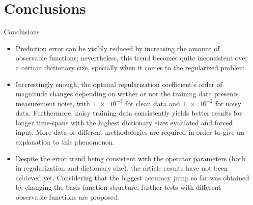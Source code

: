 \documentclass{beamer}
\begin{document}
\section{Conclusions}

\begin{frame}[allowframebreaks]{Conclusions}
    \begin{itemize}
        \item Prediction error can be visibly reduced by increasing the amount of observable functions; nevertheless, this trend becomes quite inconsistent over a certain dictionary size, specially when it comes to the regularized problem.
        \item Interestingly enough, the optimal regularization coefficient's order of magnitude changes depending on wether or not the training data presents measurement noise, with $\num{1e-3}$ for clean data and $\num{1e-2}$ for noisy data. Furthermore, noisy training data consistently yields better results for longer time-spans with the highest dictionary sizes evaluated and forced input. More data or different methodologies are required in order to give an explanation to this phenomenon.
        \item Despite the error trend being consistent with the operator parameters (both in regularization and dictionary size), the article results have not been achieved yet. Considering that the biggest accuracy jump so far was obtained by changing the basis function structure, further tests with different observable functions are proposed.
    \end{itemize}
\end{frame}
\end{document}
